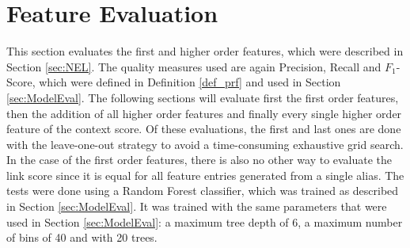 \section{Feature Evaluation}
\label{sec:FeatureEval}
This section evaluates the first and higher order features, which were described in Section \ref{sec:NEL}. The quality measures used are again Precision, Recall and $F_1$-Score, which were defined in Definition \ref{def_prf} and used in Section \ref{sec:ModelEval}. The following sections will evaluate first the first order features, then the addition of all higher order features and finally every single higher order feature of the context score. Of these evaluations, the first and last ones are done with the leave-one-out strategy to avoid a time-consuming exhaustive grid search. In the case of the first order features, there is also no other way to evaluate the link score since it is equal for all feature entries generated from a single alias. The tests were done using a Random Forest classifier, which was trained as described in Section \ref{sec:ModelEval}. It was trained with the same parameters that were used in Section \ref{sec:ModelEval}: a maximum tree depth of 6, a maximum number of bins of 40 and with 20 trees.\par

